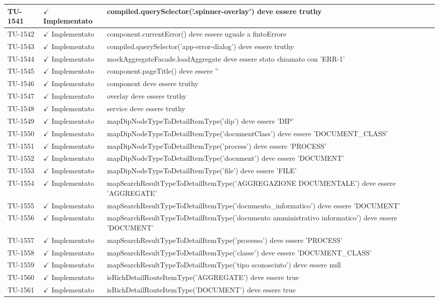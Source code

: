 ﻿\documentclass[a4paper,12pt]{article}
\newcommand{\ok}{\textcolor{green!60!black}{$\checkmark$ Implementato}}
\begin{document}
\begin{longtable}{|p{2cm}|p{3.5cm}|p{9.5cm}|}
\hline
TU-1541 & \ok & compiled.querySelector('.spinner-overlay') deve essere truthy \\
\hline
TU-1542 & \ok & component.currentError() deve essere uguale a fintoErrore \\
\hline
TU-1543 & \ok & compiled.querySelector('app-error-dialog') deve essere truthy \\
\hline
TU-1544 & \ok & mockAggregateFacade.loadAggregate deve essere stato chiamato con 'ERR-1' \\
\hline
TU-1545 & \ok & component.pageTitle() deve essere '' \\
\hline
TU-1546 & \ok & component deve essere truthy \\
\hline
TU-1547 & \ok & overlay deve essere truthy \\
\hline
TU-1548 & \ok & service deve essere truthy \\
\hline
TU-1549 & \ok & mapDipNodeTypeToDetailItemType('dip') deve essere 'DIP' \\
\hline
TU-1550 & \ok & mapDipNodeTypeToDetailItemType('documentClass') deve essere 'DOCUMENT\_CLASS' \\
\hline
TU-1551 & \ok & mapDipNodeTypeToDetailItemType('process') deve essere 'PROCESS' \\
\hline
TU-1552 & \ok & mapDipNodeTypeToDetailItemType('document') deve essere 'DOCUMENT' \\
\hline
TU-1553 & \ok & mapDipNodeTypeToDetailItemType('file') deve essere 'FILE' \\
\hline
TU-1554 & \ok & mapSearchResultTypeToDetailItemType('AGGREGAZIONE DOCUMENTALE') deve essere 'AGGREGATE' \\
\hline
TU-1555 & \ok & mapSearchResultTypeToDetailItemType('documento\_informatico') deve essere 'DOCUMENT' \\
\hline
TU-1556 & \ok & mapSearchResultTypeToDetailItemType('documento amministrativo informatico') deve essere 'DOCUMENT' \\
\hline
TU-1557 & \ok & mapSearchResultTypeToDetailItemType('processo') deve essere 'PROCESS' \\
\hline
TU-1558 & \ok & mapSearchResultTypeToDetailItemType('classe') deve essere 'DOCUMENT\_CLASS' \\
\hline
TU-1559 & \ok & mapSearchResultTypeToDetailItemType('tipo sconosciuto') deve essere null \\
\hline
TU-1560 & \ok & isRichDetailRouteItemType('AGGREGATE') deve essere true \\
\hline
TU-1561 & \ok & isRichDetailRouteItemType('DOCUMENT') deve essere true \\

\end{longtable}
\end{document}
